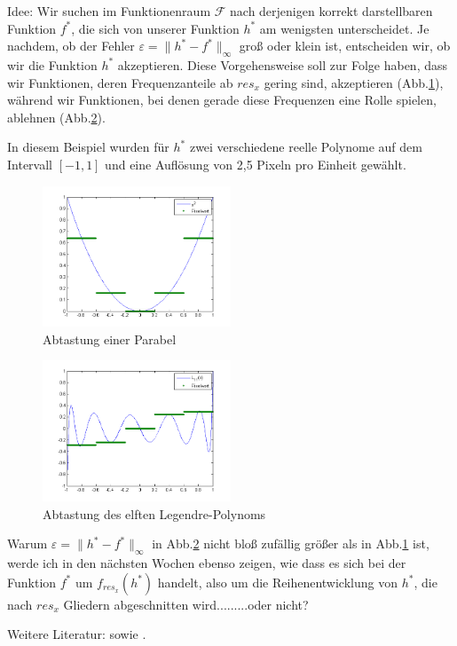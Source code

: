 \documentclass[a4paper]{article}
\begin{document}
Idee: Wir suchen im Funktionenraum $\mathcal{F}$ nach derjenigen korrekt darstellbaren Funktion $f^*$, die sich von unserer Funktion $h^*$ am wenigsten unterscheidet. Je nachdem, ob der Fehler $\varepsilon=\lVert h^*-f^*\rVert_{\infty}$ groß oder klein ist, entscheiden wir, ob wir die Funktion $h^*$ akzeptieren.
Diese Vorgehensweise soll zur Folge haben, dass wir Funktionen, deren Frequenzanteile ab $res_x$ gering sind, akzeptieren (Abb.\ref{Abb.1}), während wir Funktionen, bei denen gerade diese Frequenzen eine Rolle spielen, ablehnen (Abb.\ref{Abb.2}).

In diesem Beispiel wurden für $h^*$ zwei verschiedene reelle Polynome auf dem Intervall $[-1,1]$ und eine Auflösung von 2,5 Pixeln pro Einheit gewählt.

\begin{figure}[ht]
\centering
\includegraphics[width=0.5\textwidth]{../grafiken/parabelplot.png}
\caption{Abtastung einer Parabel}
\label{Abb.1}
\end{figure}
\begin{figure}[ht]
\centering
\includegraphics[width=0.5\textwidth]{../grafiken/legendre11plot.png}
\caption{Abtastung des elften Legendre-Polynoms}
\label{Abb.2}
\end{figure}

Warum $\varepsilon=\lVert h^*-f^*\rVert_{\infty}$ in Abb.\ref{Abb.2} nicht bloß zufällig größer als in Abb.\ref{Abb.1} ist, werde ich in den nächsten Wochen ebenso zeigen, wie dass es sich bei der Funktion $f^*$ um $f_{res_x}(h^*)$ handelt, also um die Reihenentwicklung von $h^*$, die nach $res_x$ Gliedern abgeschnitten wird.........oder nicht?

Weitere Literatur: \cite[]{Achilles1978} sowie \cite[]{Schroeder1978}.



\end{document}
